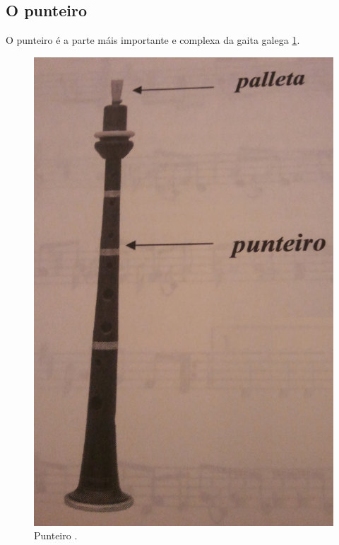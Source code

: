 \subsection{O punteiro}

 O punteiro é a parte máis importante e complexa da gaita galega
 \ref{figura:BrunoVillamorPunteiro}. \\

 \begin{figure}[htbp]
  \centering
  \includegraphics[scale=0.1,keepaspectratio=true]{./imagenes/bruno-villamor-punteiro.jpg}
  \caption[Punteiro]{Punteiro \cite{BrunoVillamorCaderno15}.}
  \label{figura:BrunoVillamorPunteiro}
 \end{figure}


